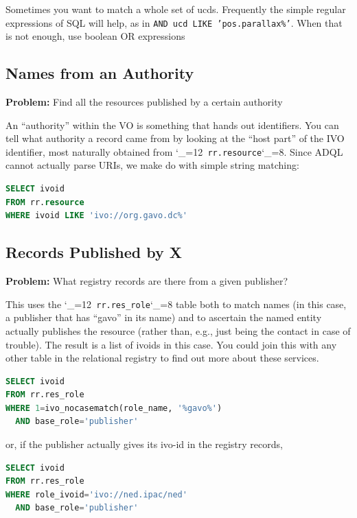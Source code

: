 \documentclass[11pt,a4paper]{ivoa}
\makeatletter
\def\rtent#1{\texttt{\color{rtcolor}\verb|#1|}}
\def\makeunderscoreletter{\catcode`\_=12}
\def\makeunderscoresubscript{\catcode`\_=8}
\def\rtent{\makeunderscoreletter\relax\rt@nt}
\def\rt@nt#1{\texttt{\color{rtcolor} #1}\makeunderscoresubscript{}}
\makeatother
\begin{document}
Sometimes you want to match a whole set of ucds.  Frequently the
simple regular expressions of SQL will help, as in
\texttt{AND ucd LIKE 'pos.parallax\%'}.  When that is not enough,
use boolean OR expressions

\subsection{Names from an Authority}

\textbf{Problem:} Find all the resources published by a certain
authority

An ``authority'' within the VO is something that hands out identifiers.
You can tell what authority a record came from by looking at the ``host
part'' of the IVO identifier, most naturally obtained from
\rtent{rr.resource}.  Since ADQL cannot actually parse
URIs, we make do with simple string matching:


\begin{lstlisting}[language=SQL,flexiblecolumns=true]
SELECT ivoid
FROM rr.resource
WHERE ivoid LIKE 'ivo://org.gavo.dc%'
\end{lstlisting}

\subsection{Records Published by X}

\textbf{Problem:} What registry records are there from a given
publisher?

This uses the
\rtent{rr.res_role}
 table both to
match names (in this case, a publisher that has ``gavo'' in its name) and
to ascertain the named entity actually publishes the resource (rather
than, e.g., just being the contact in case of trouble).  The result is a
list of ivoids in this case.  You could join this with any other
table in the relational registry to find out more about these
services.


\begin{lstlisting}[language=SQL,flexiblecolumns=true]
SELECT ivoid
FROM rr.res_role
WHERE 1=ivo_nocasematch(role_name, '%gavo%')
  AND base_role='publisher'
\end{lstlisting}

or, if the publisher actually gives its ivo-id in the registry
records,


\begin{lstlisting}[language=SQL,flexiblecolumns=true]
SELECT ivoid
FROM rr.res_role
WHERE role_ivoid='ivo://ned.ipac/ned'
  AND base_role='publisher'
\end{lstlisting}
\end{document}
